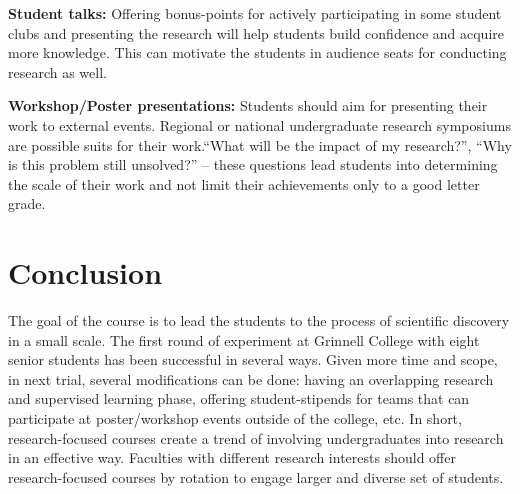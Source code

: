 \documentclass{article}
\begin{document}
\par {\bf Student talks: } Offering bonus-points for actively participating in some student clubs and presenting the research will help students build confidence and acquire more knowledge. This can motivate the students in audience seats for conducting research as well.

\par {\bf Workshop/Poster presentations: } Students should aim for presenting their work to external events. Regional or national undergraduate research symposiums are possible suits for their work.``What will be the impact of my research?'', ``Why is this problem still unsolved?'' -- these questions lead students into determining the scale of their work and not limit their achievements only to a good letter grade.



\section{Conclusion}
\label{concl}
The goal of the course is to lead the students to the process of scientific discovery in a small scale. The first round of experiment at Grinnell College with eight senior students has been successful in several ways. Given more time and scope, in next trial, several modifications can be done: having an overlapping research and supervised learning phase, offering student-stipends for teams that can participate at poster/workshop events outside of the college, etc. In short, research-focused courses create a trend of involving undergraduates into research in an effective way. Faculties with different research interests should offer research-focused courses by rotation to engage larger and diverse set of students. 
\end{document}
